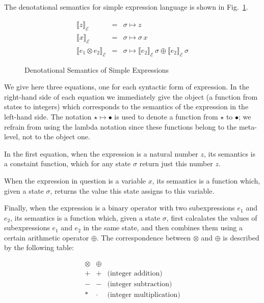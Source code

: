 \documentclass{article}
\newcommand{\sembr}[1]{\llbracket{#1}\rrbracket}
\newcommand{\ph}{{\phantom{x}}}
\begin{document}
The denotational semantics for simple expression language is shown in Fig.~\ref{se-denot}.


\begin{figure}[t]
\[
\begin{array}{rcl}
  \sembr{z}^\ph_\mathscr{E} & = & \sigma \mapsto z \\  
  \sembr{x}^\ph_\mathscr{E} & = & \sigma \mapsto \sigma\,x \\
  \sembr{e_1\otimes e_2}^\ph_\mathscr{E} & = & \sigma \mapsto \sembr{e_2}^\ph_\mathscr{E}\,\sigma\oplus\sembr{e_2}^\ph_\mathscr{E}\,\sigma
\end{array}
\]
\caption{Denotational Semantics of Simple Expressions}
\label{se-denot}
\end{figure}

We give here three equations, one for each syntactic form of expression. In the right-hand side of each equation we immediately
give the object (a function from states to integers) which corresponds to the semantics of the expression in the
left-hand side. The notation $\star \mapsto \bullet$ is used to denote a function from $\star$ to $\bullet$; we refrain from
using the lambda notation since these functions belong to the meta-level, not to the object one.

In the first equation, when the expression is a natural number $z$, its semantics is a constaint function, which for
any state $\sigma$ return just this number $z$.

When the expression in question is a variable $x$, its semantics is a function which, given a state $\sigma$, returns
the value this state assigns to this variable.

Finally, when the expression is a binary operator with two subexpressions $e_1$ and $e_2$, its semantics is a function which, given a state $\sigma$,
first calcalates the values of subexpressions $e_1$ and $e_2$ in the same state, and then combines them using a certain arithmetic operator $\oplus$.
The correspondence between $\otimes$ and $\oplus$ is described by the following table:

\[
\begin{array}{ccl}
  \otimes & \oplus & \\
  \hline
  + & +      & \mbox{(integer addition)}\\
  - & -      & \mbox{(integer subtraction)}\\
  * & \cdot  & \mbox{(integer multiplication)}
\end{array}
\]
\end{document}
